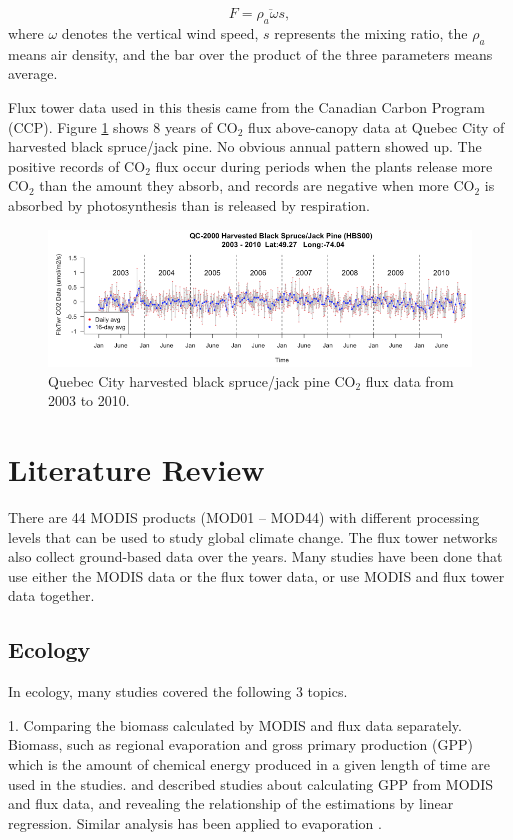 \documentclass{article}\usepackage[]{graphicx}\usepackage[]{color}
\begin{document}
\begin{equation}
F = \overline{\rho_a\omega s},
\end{equation}
where $\omega$ denotes the vertical wind speed, $s$ represents the mixing ratio, the $\rho_a$ means air density, and the bar over the product of the three parameters means average.  

Flux tower data used in this thesis came from the Canadian Carbon Program (CCP).
Figure \ref{Fig:QCmodis} shows 8 years of CO$_2$ flux above-canopy data at Quebec City of harvested black spruce/jack pine. No obvious annual pattern showed up. The positive records of CO$_2$ flux occur during periods when the plants release more CO$_2$ than the amount they absorb, and records are negative when more CO$_2$ is absorbed by photosynthesis than is released by respiration.

\begin{figure}[!ht]
\centering
\includegraphics[width=14cm]{QCmodis1.png}
\caption{Quebec City harvested black spruce/jack pine CO$_2$ flux data from 2003 to 2010.}
\label{Fig:QCmodis}
\end{figure}

\section{Literature Review}\label{Sec:LiteratureReview}

There are 44 MODIS products (MOD01 -- MOD44) with different processing levels that can be used to study global climate change.
The flux tower networks also collect ground-based data over the years. 
Many studies have been done that use either the MODIS data or the flux tower data, or use MODIS and flux tower data together. 
\subsection{Ecology}

In ecology, many studies covered the following 3 topics.

1. Comparing the biomass calculated by MODIS and flux data separately. Biomass, such as regional evaporation and gross primary production (GPP) which is the amount of chemical energy produced in a given length of time are used in the studies. \citet{heinsch2006evaluation} and \citet{kalfas2011modeling} described studies about calculating GPP from MODIS and flux data, and revealing the relationship of the estimations by linear regression. Similar analysis has been applied to evaporation \citep{cleugh2007regional}.
\end{document}

